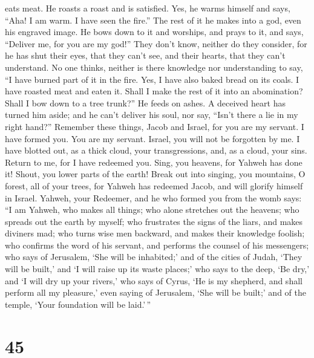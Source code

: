 eats meat. He roasts a roast and is satisfied. Yes, he warms himself and
says, ``Aha! I am warm. I have seen the fire.''  The rest
of it he makes into a god, even his engraved image. He bows down to it
and worships, and prays to it, and says, ``Deliver me, for you are my
god!''  They don't know, neither do they consider, for he
has shut their eyes, that they can't see, and their hearts, that they
can't understand.  No one thinks, neither is there
knowledge nor understanding to say, ``I have burned part of it in the
fire. Yes, I have also baked bread on its coals. I have roasted meat and
eaten it. Shall I make the rest of it into an abomination? Shall I bow
down to a tree trunk?''  He feeds on ashes. A deceived
heart has turned him aside; and he can't deliver his soul, nor say,
``Isn't there a lie in my right hand?''  Remember these
things, Jacob and Israel, for you are my servant. I have formed you. You
are my servant. Israel, you will not be forgotten by me. 
I have blotted out, as a thick cloud, your transgressions, and, as a
cloud, your sins. Return to me, for I have redeemed you. 
Sing, you heavens, for Yahweh has done it! Shout, you lower parts of the
earth! Break out into singing, you mountains, O forest, all of your
trees, for Yahweh has redeemed Jacob, and will glorify himself in
Israel.  Yahweh, your Redeemer, and he who formed you
from the womb says: ``I am Yahweh, who makes all things; who alone
stretches out the heavens; who spreads out the earth by myself;
 who frustrates the signs of the liars, and makes
diviners mad; who turns wise men backward, and makes their knowledge
foolish;  who confirms the word of his servant, and
performs the counsel of his messengers; who says of Jerusalem, `She will
be inhabited;' and of the cities of Judah, `They will be built,' and `I
will raise up its waste places;'  who says to the deep,
`Be dry,' and `I will dry up your rivers,'  who says of
Cyrus, `He is my shepherd, and shall perform all my pleasure,' even
saying of Jerusalem, `She will be built;' and of the temple, `Your
foundation will be laid.'\,''

\hypertarget{section-44}{%
\section{45}\label{section-44}}

